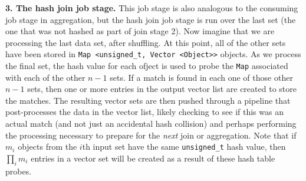 \vspace{5pt}
{\bf 3. The hash join job stage.} 
This job stage is also analogous to the consuming job stage in aggregation, but the hash join job stage is run over the last set (the one that was not 
hashed as part of join stage 2). Now imagine that we are processing the last data set, after shuffling.  At this point,
all of the other sets have been
stored in \texttt{Map <unsigned\_t, Vector <Object>>} objects.  As we process the final set,
the hash value for each ofject is used to probe the \texttt{Map}
associated with each of the other $n-1$ sets.  If a match is found in each one of those other $n-1$ sets, then
one or more entries in the output vector list are created to store the matches.  The resulting vector sets are then pushed through a pipeline that post-processes
the data in the vector list, likely checking to see if this was an actual match (and not just an accidental hash collision) and perhaps performing the processing
necessary to prepare for the \emph{next} join or aggregation.
Note that if $m_i$ objects from the $i$th input set have the same \texttt{unsigned\_t} hash value, then $\prod_i m_i$ entries in a vector set will be created
as a result of these hash table probes. 

%
%
%
